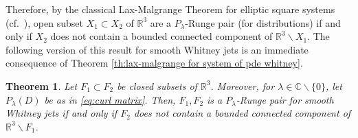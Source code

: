 \documentclass[a4paper,10pt]{amsart}
\newtheorem{theorem}{Theorem}
\newtheorem*{crucial lemma}{Lemma \ref{lem:nice polynomial2}}
\theoremstyle{definition}
\newcommand{\R}{\mathbb{R}}
\newcommand{\C}{\mathbb{C}}
\begin{document}
Therefore, by the classical Lax-Malgrange Theorem for elliptic square systems (cf.~\cite[\enquote{Cas d'un syst\'eme pour lequel $p=q$}, p.~337]{Malgrange1955}), open subset $X_1\subset X_2$ of $\R^3$ are a $P_\lambda$-Runge pair (for distributions) if and only if $X_2$ does not contain a bounded connected component of $\R^3\backslash X_1$. The following version of this result for smooth Whitney jets is an immediate consequence of Theorem \ref{th:lax-malgrange for system of pde whitney}.

\begin{theorem}\label{theo:Runge for curl}
	Let $F_1\subset F_2$ be closed subsets of $\R^3$. Moreover, for $\lambda\in\C\backslash\{0\}$, let $P_\lambda(D)$ be as in \eqref{eq:curl matrix}. Then, $F_1,F_2$ is a $P_\lambda$-Runge pair for smooth Whitney jets if and only if $F_2$ does not contain a bounded connected component of $\R^3\backslash F_1$.
\end{theorem}
\end{document}
